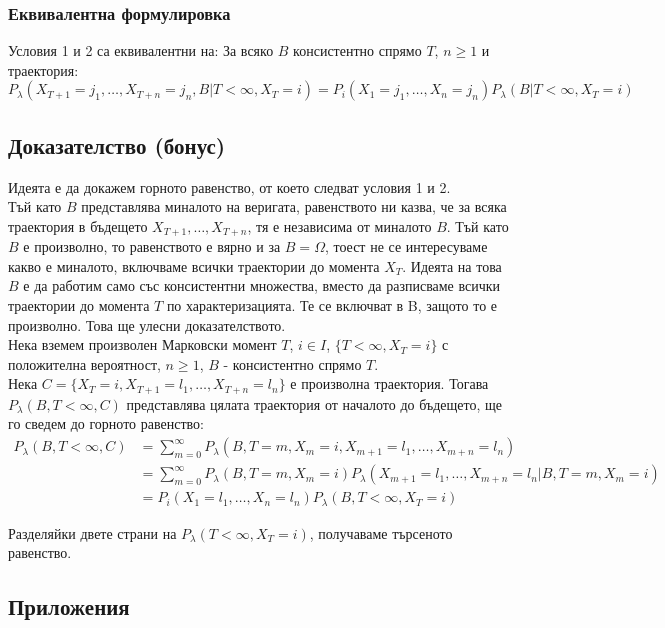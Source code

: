 \documentclass{article}
\begin{document}
\subsubsection*{Еквивалентна формулировка}
Условия 1 и 2 са еквивалентни на: За всяко $B$ консистентно спрямо $T$, $n\geq1$ и траектория:
$$P_\lambda(X_{T+1}=j_1,\dots,X_{T+n}=j_n,B|T<\infty,X_T=i) = P_i(X_1=j_1,\dots,X_n=j_n)P_\lambda(B|T<\infty,X_T=i)$$

\subsection{Доказателство (бонус)}
Идеята е да докажем горното равенство, от което следват условия 1 и 2. \\

Тъй като $B$ представлява миналото на веригата, равенството ни казва, че за всяка траектория в бъдещето $X_{T+1},\dots,X_{T+n}$, тя е независима от миналото $B$. Тъй като $B$ е произволно, то равенството е вярно и за $B=\Omega$, тоест не се интересуваме
какво е миналото, включваме всички траектории до момента $X_T$. Идеята на това $B$ е да работим само със консистентни множества, вместо да разписваме всички траектории до момента $T$ по характеризацията. Те се включват в B, защото то е произволно. Това ще улесни доказателството.\\

Нека вземем произволен Марковски момент $T$, $i\in I$, $\{T<\infty, X_T=i\}$ с положителна вероятност, $n\geq1$, $B$ - консистентно спрямо $T$. \\

Нека $C=\{X_T=i,X_{T+1}=l_1,\dots,X_{T+n}=l_n\}$ е произволна траектория. Тогава $P_\lambda(B,T<\infty,C)$ представлява цялата траектория от началото до бъдещето, ще го сведем до
горното равенство:
\begin{align*}
P_\lambda(B,T<\infty,C) &= \sum_{m=0}^\infty P_\lambda(B,T=m,X_m=i,X_{m+1}=l_1,\dots,X_{m+n}=l_n) \\
&= \sum_{m=0}^\infty P_\lambda(B,T=m, X_m=i)P_\lambda(X_{m+1}=l_1,\dots,X_{m+n}=l_n|B, T=m,X_m=i) \\
&= P_i(X_1=l_1,\dots,X_n=l_n)P_\lambda(B,T<\infty,X_T=i)
\end{align*}

Разделяйки двете страни на $P_\lambda(T<\infty,X_T=i)$, получаваме търсеното равенство.

\subsection{Приложения}
\end{document}
